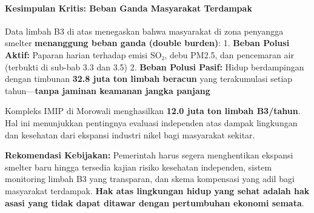 \documentclass[
]{article}
\begin{document}
\paragraph{Kesimpulan Kritis: Beban Ganda Masyarakat
Terdampak}\label{kesimpulan-kritis-beban-ganda-masyarakat-terdampak}

Data limbah B3 di atas menegaskan bahwa masyarakat di zona penyangga
smelter \textbf{menanggung beban ganda (double burden)}: 1.
\textbf{Beban Polusi Aktif:} Paparan harian terhadap emisi SO₂, debu
PM2.5, dan pencemaran air (terbukti di sub-bab 3.3 dan 3.5) 2.
\textbf{Beban Polusi Pasif:} Hidup berdampingan dengan timbunan
\textbf{32.8 juta ton limbah beracun} yang terakumulasi setiap
tahun---\textbf{tanpa jaminan keamanan jangka panjang}

Kompleks IMIP di Morowali menghasilkan \textbf{12.0 juta ton limbah
B3/tahun}. Hal ini menunjukkan pentingnya evaluasi independen atas
dampak lingkungan dan kesehatan dari ekspansi industri nikel bagi
masyarakat sekitar.

\textbf{Rekomendasi Kebijakan:} Pemerintah harus segera menghentikan
ekspansi smelter baru hingga tersedia kajian risiko kesehatan
independen, sistem monitoring limbah B3 yang transparan, dan skema
kompensasi yang adil bagi masyarakat terdampak. \textbf{Hak atas
lingkungan hidup yang sehat adalah hak asasi yang tidak dapat ditawar
dengan pertumbuhan ekonomi semata}.
\end{document}
